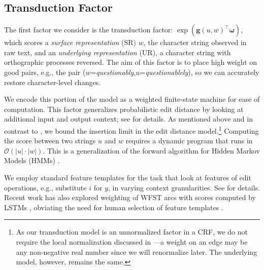 \documentclass[11pt,letterpaper]{article}
\newcommand{\word}[1]{{\em #1}}
\renewcommand{\vec}{\boldsymbol}
\newcommand{\vomega}{{\vec{\omega}}}
\newcommand{\vg}{{\vec{g}}}
\begin{document}

\subsection{Transduction Factor}
The first factor we consider is the transduction factor:
$\exp\left(\vg(u, w)^{\top}\vomega\right)$, which scores a {\em
  surface representation} (SR) $w$, the character string observed in
raw text, and an {\em underlying representation} (UR), a character
string with orthographic processes
reversed. The aim of this factor is to place high weight on good
pairs, e.g., the pair ($w$=\word{questionably},$u$=\word{questionablely}), so we can
accurately restore character-level changes.


We encode this portion of the model as a weighted finite-state
machine for ease of computation. This factor generalizes 
probabilistic edit distance \cite{ristad1998learning} by looking at
additional input and output context; see
  for details.
As mentioned above and in contrast to
, we bound the insertion limit in
the edit distance model.\footnote{As our transduction model is an unnormalized factor in a
  CRF, we do not require the local normalization discussed in
  ---a weight on an edge may
  be any non-negative real number since we will renormalize later. The
  underlying model, however, remains the same.} Computing the score between two strings $u$ and $w$ requires a dynamic program
that runs in $\mathcal{O}(|u|\cdot |w|)$. This is a generalization of the forward
algorithm for Hidden Markov Models (HMMs) \cite{rabiner1989tutorial}. 

We employ standard feature templates for the task that look at features
of edit operations, e.g., substitute $i$ for $y$, in
varying context granularities. See
 for details.
Recent work has also explored weighting of WFST arcs
with scores computed by LSTMs
\cite{hochreiter1997long}, obviating the need for human
selection of feature templates \cite{rastogi2016}.
\end{document}
